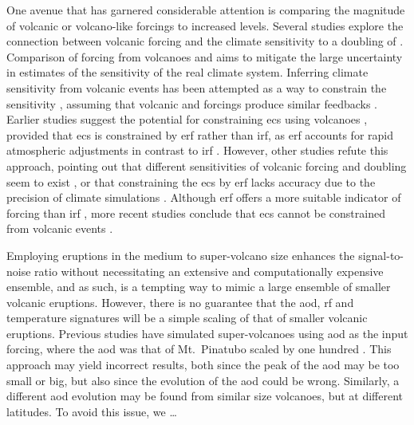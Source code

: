 \documentclass{ametsocV6.1}
\begin{document}
One avenue that has garnered considerable attention is comparing the magnitude of
volcanic or volcano-like forcings to increased  levels. Several studies explore
the connection between volcanic forcing and the climate sensitivity to a doubling of
\citep{boer2007,marvel2016,merlis2014,ollila2016,richardson2019,salvi2022,wigley2005}.
Comparison of forcing from volcanoes and  aims to mitigate the large uncertainty
in estimates of the sensitivity of the real climate system. Inferring climate
sensitivity from volcanic events has been attempted as a way to constrain the
sensitivity \citep{boer2007}, assuming that volcanic and  forcings produce
similar feedbacks \citep{pauling2023}. Earlier studies suggest the potential for
constraining \gls{ecs} using volcanoes \citep{bender2010}, provided that \gls{ecs} is
constrained by \gls{erf} rather than \gls{irf}, as \gls{erf} accounts for rapid
atmospheric adjustments in contrast to \gls{irf} \citep{richardson2019}. However, other
studies refute this approach, pointing out that different sensitivities of volcanic
forcing and  doubling seem to exist \citep{douglass2006}, or that constraining
the \gls{ecs} by \gls{erf} lacks accuracy due to the precision of climate simulations
\citep{boer2007,salvi2022}. Although \gls{erf} offers a more suitable indicator of
forcing than \gls{irf} \citep{marvel2016,richardson2019}, more recent studies conclude
that \gls{ecs} cannot be constrained from volcanic events \citep{pauling2023}.

Employing eruptions in the medium to super-volcano size enhances the signal-to-noise
ratio without necessitating an extensive and computationally expensive ensemble, and as
such, is a tempting way to mimic a large ensemble of smaller volcanic eruptions.
However, there is no guarantee that the \gls{aod}, \gls{rf} and temperature signatures
will be a simple scaling of that of smaller volcanic eruptions. Previous studies have
simulated super-volcanoes using \gls{aod} as the input forcing, where the \gls{aod} was
that of Mt.\ Pinatubo scaled by one hundred \citep{jones2005}. This approach may yield
incorrect results, both since the peak of the \gls{aod} may be too small or big, but
also since the evolution of the \gls{aod} could be wrong. Similarly, a different
\gls{aod} evolution may be found from similar size volcanoes, but at different
latitudes. To avoid this issue, we \dots
\end{document}
